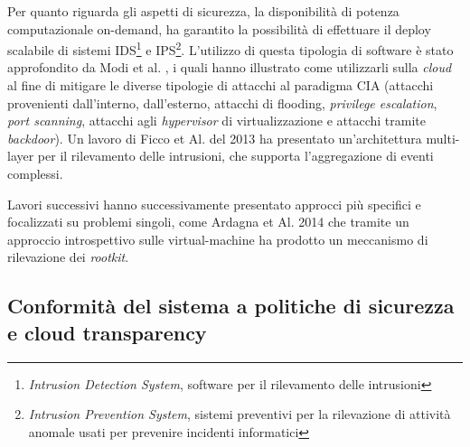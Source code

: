 \documentclass[../main.tex]{subfiles}
\begin{document}
Per quanto riguarda gli aspetti di sicurezza, la disponibilità di potenza computazionale on-demand, ha garantito la possibilità di effettuare il deploy scalabile di sistemi IDS\footnote{\textit{Intrusion Detection System}, software per il rilevamento delle intrusioni} e IPS\footnote{\textit{Intrusion Prevention System}, sistemi preventivi per la rilevazione di attività anomale usati per prevenire incidenti informatici}. 
L'utilizzo di questa tipologia di software è stato approfondito da Modi et al. \cite{7745295}, i quali hanno illustrato come utilizzarli sulla \textit{cloud} al fine di mitigare le diverse tipologie di attacchi al paradigma CIA (attacchi provenienti dall'interno, dall'esterno, attacchi di flooding, \textit{privilege escalation}, \textit{port scanning}, attacchi agli \textit{hypervisor} di virtualizzazione e attacchi tramite \textit{backdoor}). Un lavoro di Ficco et Al. del 2013\cite{6681240} ha presentato un'architettura multi-layer per il rilevamento delle intrusioni, che supporta l'aggregazione di eventi complessi.

Lavori successivi hanno successivamente presentato approcci più specifici e focalizzati su problemi singoli, come Ardagna et Al. 2014\cite{6814039} che tramite un approccio introspettivo sulle virtual-machine ha prodotto un meccanismo di rilevazione dei \textit{rootkit}.

\subsection{Conformità del sistema a politiche di sicurezza e cloud transparency}
\end{document}
